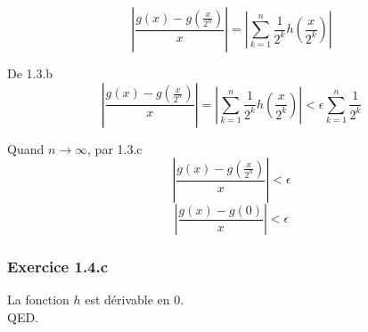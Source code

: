\documentclass[]{book}
\theoremstyle{definition}
\begin{document}
$$\left| \frac{g(x) - g(\frac{x}{2^n})}{x} \right| = \left| \sum_{k=1}^{n} {\frac{1}{2^k}h\left(\frac{x}{2^k}\right)} \right| $$

De 1.3.b
$$\left| \frac{g(x) - g(\frac{x}{2^n})}{x} \right| = \left| \sum_{k=1}^{n} {\frac{1}{2^k}h\left(\frac{x}{2^k}\right)} \right|  < \epsilon \sum_{k=1}^{n}{\frac{1}{2^k}}$$

Quand $n \to \infty$, par 1.3.c
$$\left| \frac{g(x) - g(\frac{x}{2^n})}{x} \right| < \epsilon $$
$$\left| \frac{g(x) - g(0)}{x} \right| < \epsilon $$

\subsubsection*{Exercice 1.4.c}
La fonction $h$ est d\'erivable en 0.\\


QED.
\end{document}
